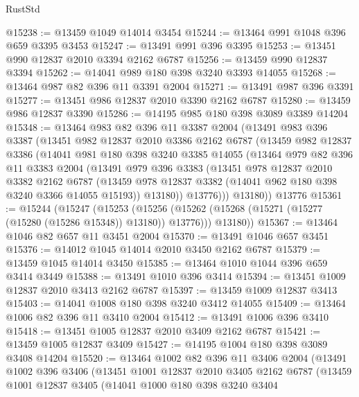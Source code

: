 \begin{lexlean}{RustStd}
\begin{coremodule}
{\begin{coremodule}
{{{{{{{{{{{{{{{{{{{{{{{{{{{{{{{@15238 := @13459 @1049 @14014 @3454
@15244 := @13464 @991 @1048 @396 @659 @3395 @3453
@15247 := @13491 @991 @396 @3395
@15253 := @13451 @990 @12837 @2010 @3394 @2162 @6787
@15256 := @13459 @990 @12837 @3394
@15262 := @14041 @989 @180 @398 @3240 @3393 @14055
@15268 := @13464 @987 @82 @396 @11 @3391 @2004
@15271 := @13491 @987 @396 @3391
@15277 := @13451 @986 @12837 @2010 @3390 @2162 @6787
@15280 := @13459 @986 @12837 @3390
@15286 := @14195 @985 @180 @398 @3089 @3389 @14204
@15348 := @13464
    @983
    @82
    @396
    @11
    @3387
    @2004
    (@13491
      @983
      @396
      @3387
      (@13451
        @982
        @12837
        @2010
        @3386
        @2162
        @6787
        (@13459
          @982
          @12837
          @3386
          (@14041
            @981
            @180
            @398
            @3240
            @3385
            @14055
            (@13464
              @979
              @82
              @396
              @11
              @3383
              @2004
              (@13491
                @979
                @396
                @3383
                (@13451
                  @978
                  @12837
                  @2010
                  @3382
                  @2162
                  @6787
                  (@13459 @978 @12837 @3382 (@14041 @962 @180 @398 @3240 @3366 @14055 @15193))
                  @13180))
              @13776)))
        @13180))
    @13776
@15361 := @15244
    (@15247
      (@15253
        (@15256 (@15262 (@15268 (@15271 (@15277 (@15280 (@15286 @15348)) @13180)) @13776)))
        @13180))
@15367 := @13464 @1046 @82 @657 @11 @3451 @2004
@15370 := @13491 @1046 @657 @3451
@15376 := @14012 @1045 @14014 @2010 @3450 @2162 @6787
@15379 := @13459 @1045 @14014 @3450
@15385 := @13464 @1010 @1044 @396 @659 @3414 @3449
@15388 := @13491 @1010 @396 @3414
@15394 := @13451 @1009 @12837 @2010 @3413 @2162 @6787
@15397 := @13459 @1009 @12837 @3413
@15403 := @14041 @1008 @180 @398 @3240 @3412 @14055
@15409 := @13464 @1006 @82 @396 @11 @3410 @2004
@15412 := @13491 @1006 @396 @3410
@15418 := @13451 @1005 @12837 @2010 @3409 @2162 @6787
@15421 := @13459 @1005 @12837 @3409
@15427 := @14195 @1004 @180 @398 @3089 @3408 @14204
@15520 := @13464
    @1002
    @82
    @396
    @11
    @3406
    @2004
    (@13491
      @1002
      @396
      @3406
      (@13451
        @1001
        @12837
        @2010
        @3405
        @2162
        @6787
        (@13459
          @1001
          @12837
          @3405
          (@14041
            @1000
            @180
            @398
            @3240
            @3404
}}}}}}}}}}}}}}}}}}}}}}}}}}}}}}}
\end{coremodule}}
\end{coremodule}
\end{lexlean}
